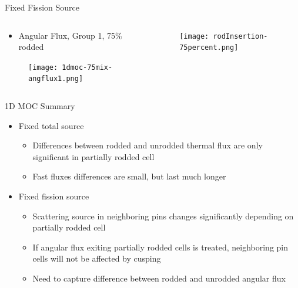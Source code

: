 
\begin{frame}[t]{Fixed Fission Source}

\begin{columns}
    \begin{column}{0.6\textwidth}
        \begin{itemize}
            \item Angular Flux, Group 1, 75\% rodded
        \end{itemize}
        \begin{figure}[H]
            \centering
            \texttt{[image: 1dmoc-75mix-angflux1.png]}
        \end{figure}
    \end{column}
    \begin{column}{0.4\textwidth}
        \begin{figure}[H]
            \centering
            \texttt{[image: rodInsertion-75percent.png]}
        \end{figure}
    \end{column}
\end{columns}

\end{frame}


\begin{frame}[t]{1D MOC Summary}
    
    \begin{itemize}
        \item Fixed total source
        \begin{itemize}
            \item Differences between rodded and unrodded thermal flux are only significant in partially rodded cell
            \item Fast fluxes differences are small, but last much longer
        \end{itemize}
        \item Fixed fission source
        \begin{itemize}
            \item Scattering source in neighboring pins changes significantly depending on partially rodded cell
            \item If angular flux exiting partially rodded cells is treated, neighboring pin cells will not be affected by cusping
            \item Need to capture difference between rodded and unrodded angular flux
        \end{itemize}
    \end{itemize}
    
\end{frame}

